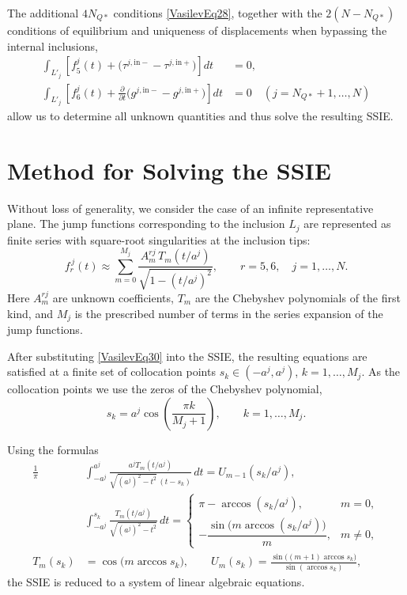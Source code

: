 The additional $4N_{Q*}$ conditions \eqref{VasilevEq28}, together with
the $2(N-N_{Q*})$ conditions of equilibrium and uniqueness of
displacements when bypassing the internal inclusions,
\begin{equation*}
	\begin{aligned}
	\int_{L'_j}
	\left[
	f_{5}^{j}(t)
	+
	\bigl(
	\tau^{j,\mathrm{in}-}
	-
	\tau^{j,\mathrm{in}+}
	\bigr)
	\right] dt
	&=0,
	\\
	\int_{L'_j}
	\left[
	f_{6}^{j}(t)
	+
	\frac{\partial}{\partial t}
	\bigl(
	g^{j,\mathrm{in}-}
	-
	g^{j,\mathrm{in}+}
	\bigr)
	\right] dt
	&=0
	\quad
	(j=N_{Q*}+1,\ldots,N)
	\end{aligned}
\end{equation*}
allow us to determine all unknown quantities and thus solve the
resulting SSIE.

\section{Method for Solving the SSIE}

Without loss of generality, we consider the case of an infinite representative plane.
The jump functions corresponding to the inclusion $L_j$ are represented
as finite series with square-root singularities at the inclusion tips:
\begin{equation}
	\label{VasilevEq30}
	f_r^{\,j}(t)
	\approx
	\sum_{m=0}^{M_j}
	\frac{A_m^{rj}\,T_m\!\left(t/a^{j}\right)}
	{\sqrt{1-\left(t/a^{j}\right)^2}},
	\qquad
	r=5,6,
	\quad
	j=1,\ldots,N.
\end{equation}
%
Here $A_m^{rj}$ are unknown coefficients, $T_m$ are the Chebyshev
polynomials of the first kind, and $M_j$ is the prescribed number of
terms in the series expansion of the jump functions.

After substituting \eqref{VasilevEq30} into the SSIE, the resulting
equations are satisfied at a finite set of collocation points
$s_k\in(-a^{j},a^{j})$, $k=1,\ldots,M_j$.
As the collocation points we use the zeros of the Chebyshev polynomial,
\[
s_k
=
a^{j}\cos\!\left(\frac{\pi k}{M_j+1}\right),
\qquad
k=1,\ldots,M_j .
\]

Using the formulas~\cite{Vasilev25}
\begin{align*}
\frac{1}{\pi}&
\int_{-a^{j}}^{a^{j}}
\frac{a^{j}T_m(t/a^{j})}
{\sqrt{(a^{j})^{2}-t^{2}}\,(t-s_k)}\,dt
=
U_{m-1}(s_k/a^{j}),
\\
&\int_{-a^{j}}^{s_k}
\frac{T_m(t/a^{j})}
{\sqrt{(a^{j})^{2}-t^{2}}}\,dt
=
\begin{cases}
	\pi-\arccos(s_k/a^{j}),
	& m=0,
	\\[4pt]
	-\dfrac{\sin\!\bigl(m\arccos(s_k/a^{j})\bigr)}{m},
	& m\neq 0,
\end{cases}
\\
T_m(s_k)&=\cos\!\bigl(m\arccos s_k\bigr),
\qquad
U_m(s_k)
=
\frac{
	\sin\!\bigl((m+1)\arccos s_k\bigr)
}{
	\sin(\arccos s_k)
},
\end{align*}
%
the SSIE is reduced to a system of linear algebraic equations.

